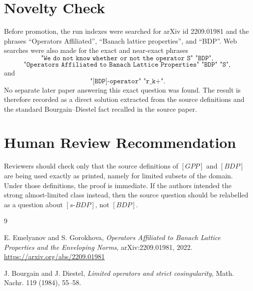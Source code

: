 \documentclass[11pt]{article}
\begin{document}
\section*{Novelty Check}

Before promotion, the run indexes were searched for arXiv id 2209.01981 and
the phrases ``Operators Affiliated'', ``Banach lattice properties'', and
``BDP''. Web searches were also made for the exact and near-exact phrases
\[
\texttt{"We do not know whether or not the operator S" "BDP"},
\]
\[
\texttt{"Operators Affiliated to Banach Lattice Properties" "BDP" "S"},
\]
and
\[
\texttt{"[BDP]-operator" "r\_k\^+"}.
\]
No separate later paper answering this exact question was found. The result is
therefore recorded as a direct solution extracted from the source definitions
and the standard Bourgain--Diestel fact recalled in the source paper.

\section*{Human Review Recommendation}

Reviewers should check only that the source definitions of \([GPP]\) and
\([BDP]\) are being used exactly as printed, namely for limited subsets of
the domain. Under those definitions, the proof is immediate. If the authors
intended the strong almost-limited class instead, then the source question
should be relabelled as a question about \([s\text{-}BDP]\), not \([BDP]\).

\begin{thebibliography}{9}

E. Emelyanov and S. Gorokhova,
\emph{Operators Affiliated to Banach Lattice Properties and the Enveloping Norms},
arXiv:2209.01981, 2022.
\url{https://arxiv.org/abs/2209.01981}

J. Bourgain and J. Diestel,
\emph{Limited operators and strict cosingularity},
Math. Nachr. 119 (1984), 55--58.

\end{thebibliography}
\end{document}
